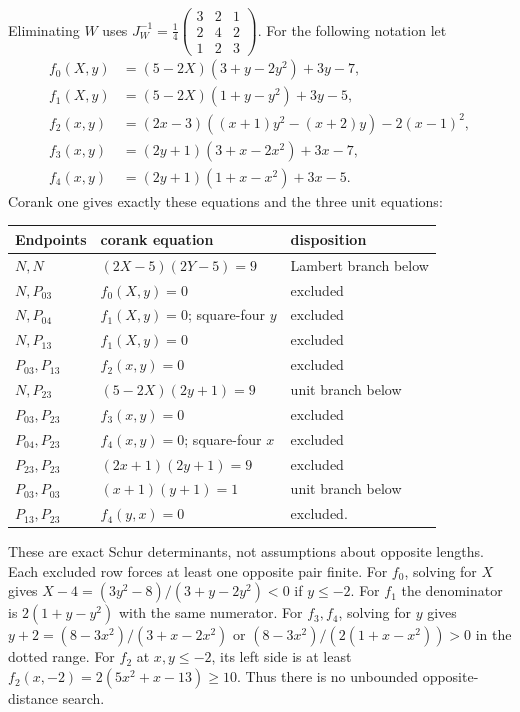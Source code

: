 \documentclass[11pt]{article}
\begin{document}
Eliminating $W$ uses
$J_W^{-1}=\frac14\left(\begin{smallmatrix}3&2&1\\2&4&2\\1&2&3\end{smallmatrix}\right)$.
For the following notation let
\[
\begin{split}
 f_0(X,y)&=(5-2X)(3+y-2y^2)+3y-7,\\
 f_1(X,y)&=(5-2X)(1+y-y^2)+3y-5,\\
 f_2(x,y)&=(2x-3)((x+1)y^2-(x+2)y)-2(x-1)^2,\\
 f_3(x,y)&=(2y+1)(3+x-2x^2)+3x-7,\\
 f_4(x,y)&=(2y+1)(1+x-x^2)+3x-5.
\end{split}
\]
Corank one gives exactly these equations and the three unit equations:
\begin{center}\small
\begin{tabular}{lll}\toprule
Endpoints&corank equation&disposition\\ \midrule
$N,N$&$(2X-5)(2Y-5)=9$&Lambert branch below\\
$N,P_{03}$&$f_0(X,y)=0$&excluded\\
$N,P_{04}$&$f_1(X,y)=0$; square-four $y$&excluded\\
$N,P_{13}$&$f_1(X,y)=0$&excluded\\
$P_{03},P_{13}$&$f_2(x,y)=0$&excluded\\
$N,P_{23}$&$(5-2X)(2y+1)=9$&unit branch below\\
$P_{03},P_{23}$&$f_3(x,y)=0$&excluded\\
$P_{04},P_{23}$&$f_4(x,y)=0$; square-four $x$&excluded\\
$P_{23},P_{23}$&$(2x+1)(2y+1)=9$&excluded\\
$P_{03},P_{03}$&$(x+1)(y+1)=1$&unit branch below\\
$P_{13},P_{23}$&$f_4(y,x)=0$&excluded.\\ \bottomrule
\end{tabular}\end{center}
These are exact Schur determinants, not assumptions about opposite
lengths. Each excluded row forces at least one opposite pair finite.
For $f_0$, solving for $X$ gives
$X-4=(3y^2-8)/(3+y-2y^2)<0$ if $y\le-2$.
For $f_1$ the denominator is $2(1+y-y^2)$ with the same numerator.
For $f_3,f_4$, solving for $y$ gives
$y+2=(8-3x^2)/(3+x-2x^2)$ or
$(8-3x^2)/(2(1+x-x^2))>0$ in the dotted range.
For $f_2$ at $x,y\le-2$, its left side is at least
$f_2(x,-2)=2(5x^2+x-13)\ge10$.
Thus there is no unbounded opposite-distance search.
\end{document}

